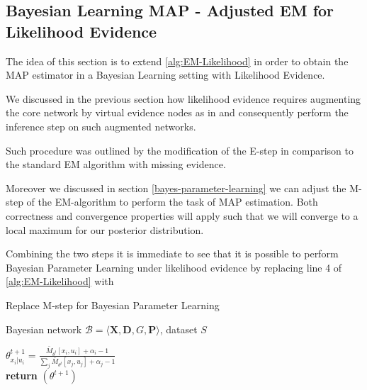 \documentclass[11pt]{article}
\begin{document}
\newpage

\subsection{Bayesian Learning MAP - Adjusted EM for Likelihood Evidence}
\label{sec:org861b842}

The idea of this section is to extend \ref{alg:EM-Likelihood} in
order to obtain the MAP estimator in a Bayesian Learning setting
with Likelihood Evidence.

We discussed in the previous section how likelihood evidence
requires augmenting the core network by virtual evidence nodes as
in \cite{pearl2014probabilistic} and consequently perform the
inference step on such augmented networks.

Such procedure was outlined by the modification of the E-step in
comparison to the standard EM algorithm with missing evidence.

Moreover we discussed in section \ref{bayes-parameter-learning} we
can adjust the M-step of the EM-algorithm to perform the task of
MAP estimation. Both correctness and convergence properties will
apply such that we will converge to a local maximum for our
posterior distribution.

Combining the two steps it is immediate to see that it is possible
to perform Bayesian Parameter Learning under likelihood evidence
by replacing line 4 of \ref{alg:EM-Likelihood} with 

\begin{algorithm*}[h!]
\caption{Replace M-step for Bayesian Parameter Learning}
\label{alg:Bayes-EM-Likelihood}
\vspace{-10pt}
\begin{multicols}{2}
\begin{algorithmic}[1] 
\Require Bayesian network $\mathcal{B}=\langle \mathbf{X},\mathbf{D}, G, \mathbf{P} \rangle$, dataset $S$ 

   \State $\theta_{x_{i}|u_{i}}^{t+1}=\frac{\bar{M}_{\theta^{t}}[x_{i},u_{i}] + \alpha_i - 1}{\sum_j \bar{M}_{\theta^{t}}[x_{j},u_{j}] + \alpha_j - 1}$\\
   
   \textbf{return} $(\theta^{t+1})$

\end{algorithmic}
\end{multicols}
\end{algorithm*}
\end{document}
